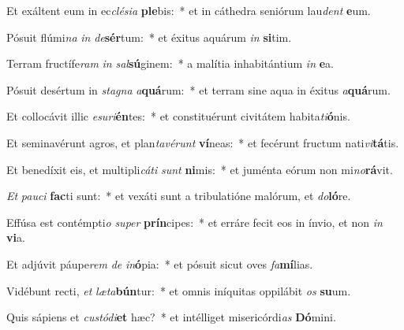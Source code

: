 \item Et exáltent eum in ec\textit{clé}\textit{si}\textit{a} \textbf{ple}bis:~* et in cáthedra seniórum lau\textit{dent} \textbf{e}um.
\item Pósuit flúmi\textit{na} \textit{in} \textit{de}\textbf{sér}tum:~* et éxitus aquárum \textit{in} \textbf{si}tim.
\item Terram fructífe\textit{ram} \textit{in} \textit{sal}\textbf{sú}ginem:~* a malítia inhabitántium \textit{in} \textbf{e}a.
\item Pósuit desértum in \textit{sta}\textit{gna} \textit{a}\textbf{quá}rum:~* et terram sine aqua in éxitus \textit{a}\textbf{quá}rum.
\item Et collocávit illic \textit{e}\textit{su}\textit{ri}\textbf{én}tes:~* et constituérunt civitátem habita\textit{ti}\textbf{ó}nis.
\item Et seminavérunt agros, et plan\textit{ta}\textit{vé}\textit{runt} \textbf{ví}neas:~* et fecérunt fructum nati\textit{vi}\textbf{tá}tis.
\item Et benedíxit eis, et multipli\textit{cá}\textit{ti} \textit{sunt} \textbf{ni}mis:~* et juménta eórum non mi\textit{no}\textbf{rá}vit.
\item \textit{Et} \textit{pau}\textit{ci} \textbf{fac}ti sunt:~* et vexáti sunt a tribulatióne malórum, et \textit{do}\textbf{ló}re.
\item Effúsa est contémpti\textit{o} \textit{su}\textit{per} \textbf{prín}cipes:~* et erráre fecit eos in ínvio, et non \textit{in} \textbf{vi}a.
\item Et adjúvit páupe\textit{rem} \textit{de} \textit{in}\textbf{ó}pia:~* et pósuit sicut oves \textit{fa}\textbf{mí}lias.
\item Vidébunt recti, \textit{et} \textit{læ}\textit{ta}\textbf{bún}tur:~* et omnis iníquitas oppilábit \textit{os} \textbf{su}um.
\item Quis sápiens et \textit{cus}\textit{tó}\textit{di}\textbf{et} hæc?~* et intélliget misericórdi\textit{as} \textbf{Dó}mini.
